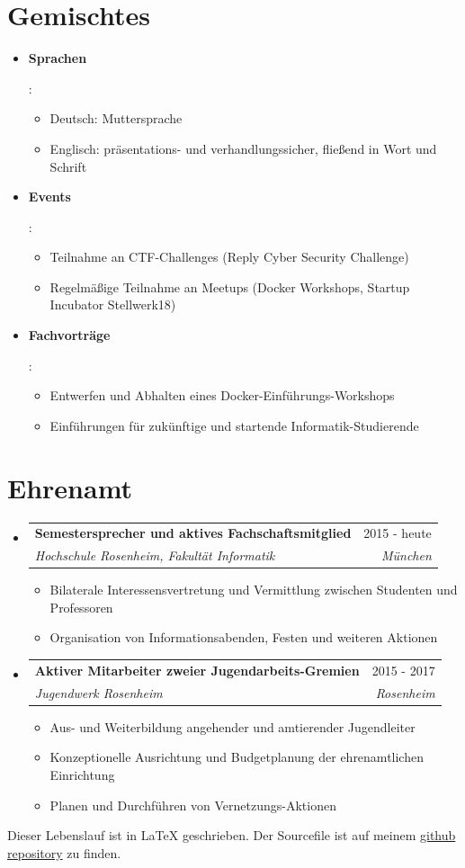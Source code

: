 \documentclass[letterpaper,11pt]{article}
\makeatletter
\newcommand{\resumeItemWithoutHeadline}[1]{
	\item\small{
		{#1 \vspace{-2pt}}
	}
}
\newcommand{\resumeSubheading}[4]{
  \vspace{-1pt}\item
    \begin{tabular*}{0.97\textwidth}[t]{l@{\extracolsep{\fill}}r}
      \textbf{#1} & #2 \\
      \textit{\small#3} & \textit{\small #4} \\
    \end{tabular*}\vspace{-5pt}
}
\newcommand{\resumeSubHeadingListStart}{\begin{itemize}[leftmargin=*]}
\newcommand{\resumeSubHeadingListEnd}{\end{itemize}}
\newcommand{\resumeItemListStart}{\begin{itemize}}
\newcommand{\resumeItemListEnd}{\end{itemize}\vspace{-5pt}}
\makeatother
\begin{document}
\section{Gemischtes}
\resumeSubHeadingListStart
\item{
	\textbf{Sprachen}{: 	
	\resumeItemListStart
		\resumeItemWithoutHeadline
		{Deutsch: Muttersprache}
		\resumeItemWithoutHeadline
		{Englisch: präsentations- und verhandlungssicher, fließend in Wort und Schrift}
	\resumeItemListEnd
}}
\item{
	\textbf{Events}{: 	
	\resumeItemListStart
		\resumeItemWithoutHeadline
		{Teilnahme an CTF-Challenges (Reply Cyber Security Challenge)}
		\resumeItemWithoutHeadline
		{Regelmäßige Teilnahme an Meetups (Docker Workshops, Startup Incubator Stellwerk18)}
	\resumeItemListEnd
}}
\item{
	\textbf{Fachvorträge}{: 
	\resumeItemListStart
		\resumeItemWithoutHeadline
		{Entwerfen und Abhalten eines Docker-Einführungs-Workshops}
		\resumeItemWithoutHeadline
		{Einführungen für zukünftige und startende Informatik-Studierende}
	\resumeItemListEnd
}}
\resumeSubHeadingListEnd

\section{Ehrenamt}
  \resumeSubHeadingListStart
  
	\resumeSubheading
	{Semestersprecher und aktives Fachschaftsmitglied}{2015 - heute}
	{Hochschule Rosenheim, Fakultät Informatik}{München}
	\resumeItemListStart
		\resumeItemWithoutHeadline
		{Bilaterale Interessensvertretung und Vermittlung zwischen Studenten und Professoren}
		\resumeItemWithoutHeadline
		{Organisation von Informationsabenden, Festen und weiteren Aktionen}
	\resumeItemListEnd
	
	\resumeSubheading
	{Aktiver Mitarbeiter zweier Jugendarbeits-Gremien}{2015 - 2017}
	{Jugendwerk Rosenheim}{Rosenheim}
	\resumeItemListStart
		\resumeItemWithoutHeadline
		{Aus- und Weiterbildung angehender und amtierender Jugendleiter}
		\resumeItemWithoutHeadline
		{Konzeptionelle Ausrichtung und Budgetplanung der ehrenamtlichen Einrichtung}
		\resumeItemWithoutHeadline
		{Planen und Durchführen von Vernetzungs-Aktionen}
	\resumeItemListEnd
	
  \resumeSubHeadingListEnd


\raggedleft 
\tiny{Dieser Lebenslauf ist in LaTeX geschrieben. Der Sourcefile ist auf meinem \href{https://github.com/gramsimamsi/resume/blob/master/lukas_grams_resume.tex}{github repository} zu finden. }
\end{document}

